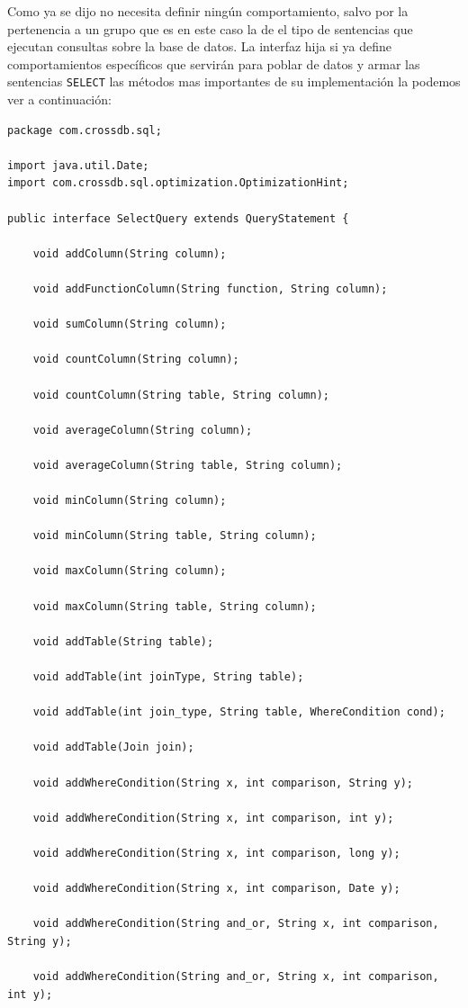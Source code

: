 Como ya se dijo no necesita definir ningún comportamiento, salvo por la pertenencia a un grupo que es en este caso la de el tipo de sentencias que ejecutan consultas sobre la base de datos. La interfaz hija si ya define comportamientos específicos que servirán para poblar de datos y armar las sentencias \verb=SELECT= las métodos mas importantes de su implementación la podemos ver a continuación:

\begin{lstlisting}[title=código interfaz UpdateStatement]
package com.crossdb.sql;

import java.util.Date;
import com.crossdb.sql.optimization.OptimizationHint;

public interface SelectQuery extends QueryStatement {

	void addColumn(String column);

	void addFunctionColumn(String function, String column);

	void sumColumn(String column);

	void countColumn(String column);

	void countColumn(String table, String column);

	void averageColumn(String column);

	void averageColumn(String table, String column);

	void minColumn(String column);

	void minColumn(String table, String column);

	void maxColumn(String column);

	void maxColumn(String table, String column);

	void addTable(String table);

	void addTable(int joinType, String table);

	void addTable(int join_type, String table, WhereCondition cond);

	void addTable(Join join);

	void addWhereCondition(String x, int comparison, String y);

	void addWhereCondition(String x, int comparison, int y);

	void addWhereCondition(String x, int comparison, long y);

	void addWhereCondition(String x, int comparison, Date y);

	void addWhereCondition(String and_or, String x, int comparison, String y);

	void addWhereCondition(String and_or, String x, int comparison, int y);


\end{lstlisting}
